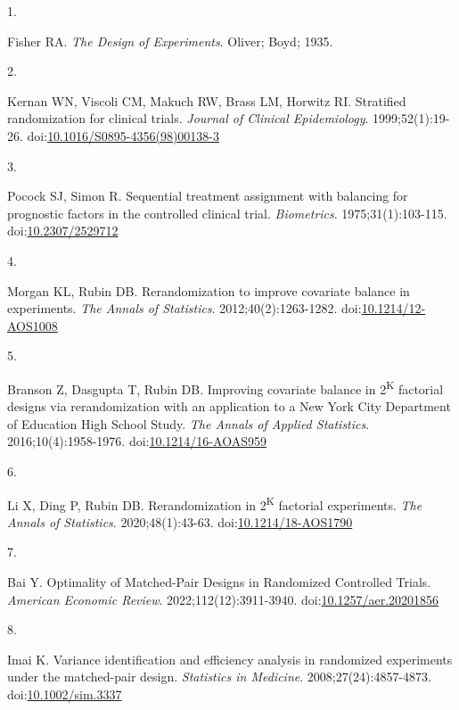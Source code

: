\documentclass[
  11pt,
]{article}
\newlength{\cslhangindent}
\newlength{\csllabelwidth}
\newenvironment{CSLReferences}[2] %
 {\begin{list}{}{%
  \setlength{\itemindent}{0pt}
  \setlength{\leftmargin}{0pt}
  \setlength{\parsep}{0pt}
  \ifodd #1
   \setlength{\leftmargin}{\cslhangindent}
   \setlength{\itemindent}{-1\cslhangindent}
  \fi
  \setlength{\itemsep}{#2\baselineskip}}}
 {\end{list}}
\newcommand{\CSLLeftMargin}[1]{\parbox[t]{\csllabelwidth}{\strut#1\strut}}
\newcommand{\CSLRightInline}[1]{\parbox[t]{\linewidth - \csllabelwidth}{\strut#1\strut}}
\begin{document}
\protect{}\label{refs}
\begin{CSLReferences}{0}{1}
\CSLLeftMargin{1. }%
\CSLRightInline{Fisher RA. \emph{The Design of Experiments}. Oliver; Boyd; 1935.}

\CSLLeftMargin{2. }%
\CSLRightInline{Kernan WN, Viscoli CM, Makuch RW, Brass LM, Horwitz RI. Stratified randomization for clinical trials. \emph{Journal of Clinical Epidemiology}. 1999;52(1):19-26. doi:\href{https://doi.org/10.1016/S0895-4356(98)00138-3}{10.1016/S0895-4356(98)00138-3}}

\CSLLeftMargin{3. }%
\CSLRightInline{Pocock SJ, Simon R. Sequential treatment assignment with balancing for prognostic factors in the controlled clinical trial. \emph{Biometrics}. 1975;31(1):103-115. doi:\href{https://doi.org/10.2307/2529712}{10.2307/2529712}}

\CSLLeftMargin{4. }%
\CSLRightInline{Morgan KL, Rubin DB. Rerandomization to improve covariate balance in experiments. \emph{The Annals of Statistics}. 2012;40(2):1263-1282. doi:\href{https://doi.org/10.1214/12-AOS1008}{10.1214/12-AOS1008}}

\CSLLeftMargin{5. }%
\CSLRightInline{Branson Z, Dasgupta T, Rubin DB. Improving covariate balance in 2\textsuperscript{K} factorial designs via rerandomization with an application to a {New York City Department} of {Education High School Study}. \emph{The Annals of Applied Statistics}. 2016;10(4):1958-1976. doi:\href{https://doi.org/10.1214/16-AOAS959}{10.1214/16-AOAS959}}

\CSLLeftMargin{6. }%
\CSLRightInline{Li X, Ding P, Rubin DB. Rerandomization in 2\textsuperscript{K} factorial experiments. \emph{The Annals of Statistics}. 2020;48(1):43-63. doi:\href{https://doi.org/10.1214/18-AOS1790}{10.1214/18-AOS1790}}

\CSLLeftMargin{7. }%
\CSLRightInline{Bai Y. Optimality of {Matched-Pair Designs} in {Randomized Controlled Trials}. \emph{American Economic Review}. 2022;112(12):3911-3940. doi:\href{https://doi.org/10.1257/aer.20201856}{10.1257/aer.20201856}}

\CSLLeftMargin{8. }%
\CSLRightInline{Imai K. Variance identification and efficiency analysis in randomized experiments under the matched-pair design. \emph{Statistics in Medicine}. 2008;27(24):4857-4873. doi:\href{https://doi.org/10.1002/sim.3337}{10.1002/sim.3337}}


\end{CSLReferences}
\end{document}
